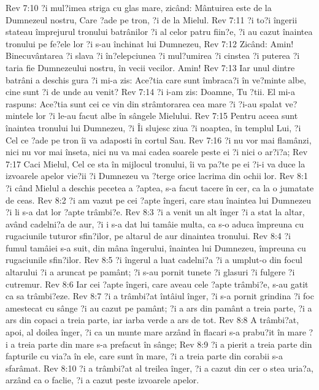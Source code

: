Rev 7:10  ?i mul?imea striga cu glas mare, zicând: Mântuirea este de la Dumnezeul nostru, Care ?ade pe tron, ?i de la Mielul.
Rev 7:11  ?i to?i îngerii stateau împrejurul tronului batrânilor ?i al celor patru fiin?e, ?i au cazut înaintea tronului pe fe?ele lor ?i s-au închinat lui Dumnezeu,
Rev 7:12  Zicând: Amin! Binecuvântarea ?i slava ?i în?elepciunea ?i mul?umirea ?i cinstea ?i puterea ?i taria fie Dumnezeului nostru, în vecii vecilor. Amin!
Rev 7:13  Iar unul dintre batrâni a deschis gura ?i mi-a zis: Ace?tia care sunt îmbraca?i în ve?minte albe, cine sunt ?i de unde au venit?
Rev 7:14  ?i i-am zis: Doamne, Tu ?tii. El mi-a raspuns: Ace?tia sunt cei ce vin din strâmtorarea cea mare ?i ?i-au spalat ve?mintele lor ?i le-au facut albe în sângele Mielului.
Rev 7:15  Pentru aceea sunt înaintea tronului lui Dumnezeu, ?i Îi slujesc ziua ?i noaptea, în templul Lui, ?i Cel ce ?ade pe tron îi va adaposti în cortul Sau.
Rev 7:16  ?i nu vor mai flamânzi, nici nu vor mai înseta, nici nu va mai cadea soarele peste ei ?i nici o ar?i?a;
Rev 7:17  Caci Mielul, Cel ce sta în mijlocul tronului, îi va pa?te pe ei ?i-i va duce la izvoarele apelor vie?ii ?i Dumnezeu va ?terge orice lacrima din ochii lor.
Rev 8:1  ?i când Mielul a deschis pecetea a ?aptea, s-a facut tacere în cer, ca la o jumatate de ceas.
Rev 8:2  ?i am vazut pe cei ?apte îngeri, care stau înaintea lui Dumnezeu ?i li s-a dat lor ?apte trâmbi?e.
Rev 8:3  ?i a venit un alt înger ?i a stat la altar, având cadelni?a de aur, ?i i s-a dat lui tamâie multa, ca s-o aduca împreuna cu rugaciunile tuturor sfin?ilor, pe altarul de aur dinaintea tronului.
Rev 8:4  ?i fumul tamâiei s-a suit, din mâna îngerului, înaintea lui Dumnezeu, împreuna cu rugaciunile sfin?ilor.
Rev 8:5  ?i îngerul a luat cadelni?a ?i a umplut-o din focul altarului ?i a aruncat pe pamânt; ?i s-au pornit tunete ?i glasuri ?i fulgere ?i cutremur.
Rev 8:6  Iar cei ?apte îngeri, care aveau cele ?apte trâmbi?e, s-au gatit ca sa trâmbi?eze.
Rev 8:7  ?i a trâmbi?at întâiul înger, ?i s-a pornit grindina ?i foc amestecat cu sânge ?i au cazut pe pamânt; ?i a ars din pamânt a treia parte, ?i a ars din copaci a treia parte, iar iarba verde a ars de tot.
Rev 8:8  A trâmbi?at, apoi, al doilea înger, ?i ca un munte mare arzând în flacari s-a prabu?it în mare ?i a treia parte din mare s-a prefacut în sânge;
Rev 8:9  ?i a pierit a treia parte din fapturile cu via?a în ele, care sunt în mare, ?i a treia parte din corabii s-a sfarâmat.
Rev 8:10  ?i a trâmbi?at al treilea înger, ?i a cazut din cer o stea uria?a, arzând ca o faclie, ?i a cazut peste izvoarele apelor.
